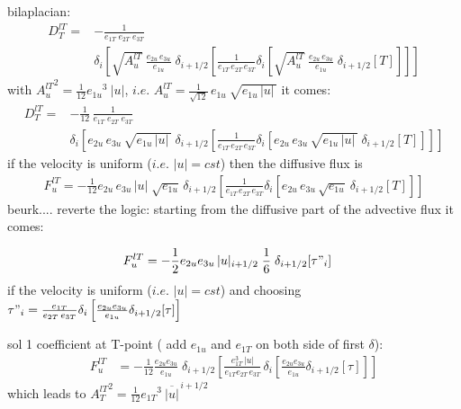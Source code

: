 \documentclass[../main/NEMO_manual]{subfiles}
\begin{document}
bilaplacian:
\begin{equation}
  \label{eq:tra_ldf_lap}
  \begin{split}
    D_T^{lT} =&-\frac{1}{e_{1T} \; e_{2T}\;  e_{3T}} \\
    & \delta_i \left[  \sqrt{A_u^{lT}}\ \frac{e_{2u}\,e_{3u}}{e_{1u}}\;\delta_{i+1/2}
      \left[ \frac{1}{e_{1T}\,e_{2T}\, e_{3T}}
        \delta_i \left[ \sqrt{A_u^{lT}}\ \frac{e_{2u}\,e_{3u}}{e_{1u}}\;\delta_{i+1/2}
          [T] \right] \right] \right]
  \end{split}
\end{equation}
with ${A_u^{lT}}^2 = \frac{1}{12} {e_{1u}}^3\ |u|$, 
$i.e.$ $A_u^{lT} = \frac{1}{\sqrt{12}} \,e_{1u}\ \sqrt{ e_{1u}\,|u|\,}$
it comes:
\begin{equation}
  \label{eq:tra_ldf_lap}
  \begin{split}
    D_T^{lT} =&-\frac{1}{12}\,\frac{1}{e_{1T} \; e_{2T}\;  e_{3T}} \\
    & \delta_i \left[ e_{2u}\,e_{3u}\,\sqrt{ e_{1u}\,|u|\,}\;\delta_{i+1/2}
      \left[ \frac{1}{e_{1T}\,e_{2T}\, e_{3T}}
        \delta_i \left[ e_{2u}\,e_{3u}\,\sqrt{ e_{1u}\,|u|\,}\;\delta_{i+1/2}
          [T] \right] \right] \right]
  \end{split}
\end{equation}
if the velocity is uniform ($i.e.$ $|u|=cst$) then the diffusive flux is
\begin{equation}
  \label{eq:tra_ldf_lap}
  \begin{split}
    F_u^{lT} = - \frac{1}{12}
    e_{2u}\,e_{3u}\,|u| \;\sqrt{ e_{1u}}\,\delta_{i+1/2}
    \left[ \frac{1}{e_{1T}\,e_{2T}\, e_{3T}}
      \delta_i \left[ e_{2u}\,e_{3u}\,\sqrt{ e_{1u}}\:\delta_{i+1/2}
        [T] \right] \right]
  \end{split}
\end{equation}
beurk....  reverte the logic: starting from the diffusive part of the advective flux it comes:

\begin{equation}
  \label{eq:tra_adv_ubs2}
  \begin{split}
    F_u^{lT} &= - \frac{1}{2} e_{2u} e_{3u}\,|u|_{i+1/2} \;\frac{1}{6} \;\delta_{i+1/2}[\tau"_i]
  \end{split}
\end{equation}
if the velocity is uniform ($i.e.$ $|u|=cst$) and
choosing $\tau "_i =\frac{e_{1T}}{e_{2T}\,e_{3T}}\delta_i \left[ \frac{e_{2u} e_{3u} }{e_{1u} } \delta_{i+1/2}[\tau] \right]$

sol 1 coefficient at T-point ( add $e_{1u}$ and $e_{1T}$ on both side of first $\delta$):
\begin{equation}
  \label{eq:tra_adv_ubs2}
  \begin{split}
    F_u^{lT} &= - \frac{1}{12} \frac{e_{2u} e_{3u}}{e_{1u}}\;\delta_{i+1/2}\left[ \frac{e_{1T}^3\,|u|}{e_{1T}e_{2T}\,e_{3T}}\,\delta_i \left[ \frac{e_{2u} e_{3u} }{e_{1u} } \delta_{i+1/2}[\tau] \right] \right]
  \end{split}
\end{equation}
which leads to ${A_T^{lT}}^2 = \frac{1}{12} {e_{1T}}^3\ \overline{|u|}^{\,i+1/2}$
\end{document}
